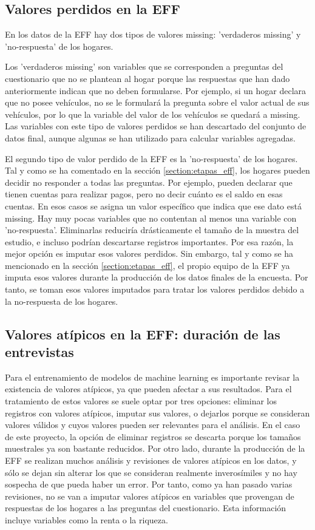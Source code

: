 \subsection*{Valores perdidos en la EFF}
\label{subsection:missing}

En los datos de la EFF hay dos tipos de valores missing: 'verdaderos missing' y 'no-respuesta' de los hogares.

Los 'verdaderos missing' son variables que se corresponden a preguntas del cuestionario que no se plantean al hogar porque las respuestas que han dado anteriormente indican que no deben formularse. Por ejemplo, si un hogar declara que no posee vehículos, no se le formulará la pregunta sobre el valor actual de sus vehículos, por lo que la variable del valor de los vehículos se quedará a missing. Las variables con este tipo de valores perdidos se han descartado del conjunto de datos final, aunque algunas se han utilizado para calcular variables agregadas.

El segundo tipo de valor perdido de la EFF es la 'no-respuesta' de los hogares. Tal y como se ha comentado en la sección \ref{section:etapas_eff}, los hogares pueden decidir no responder a todas las preguntas. Por ejemplo, pueden declarar que tienen cuentas para realizar pagos, pero no decir cuánto es el saldo en esas cuentas. En esos casos se asigna un valor específico que indica que ese dato está missing. Hay muy pocas variables que no contentan al menos una variable con 'no-respuesta'. Eliminarlas reduciría drásticamente el tamaño de la muestra del estudio, e incluso podrían descartarse registros importantes. Por esa razón, la mejor opción es imputar esos valores perdidos. Sin embargo, tal y como se ha mencionado en la sección \ref{section:etapas_eff}, el propio equipo de la EFF ya imputa esos valores durante la producción de los datos finales de la encuesta. Por tanto, se toman esos valores imputados para tratar los valores perdidos debido a la no-respuesta de los hogares.


\subsection*{Valores atípicos en la EFF: duración de las entrevistas}
\label{subsection:outliers}

Para el entrenamiento de modelos de machine learning es importante revisar la existencia de valores atípicos, ya que pueden afectar a sus resultados. Para el tratamiento de estos valores se suele optar por tres opciones: eliminar los registros con valores atípicos, imputar sus valores, o dejarlos porque se consideran valores válidos y cuyos valores pueden ser relevantes para el análisis. En el caso de este proyecto, la opción de eliminar registros se descarta porque los tamaños muestrales ya son bastante reducidos. Por otro lado, durante la producción de la EFF se realizan muchos análisis y revisiones de valores atípicos en los datos, y sólo se dejan sin alterar los que se consideran realmente inverosímiles y no hay sospecha de que pueda haber un error. Por tanto, como ya han pasado varias revisiones, no se van a imputar valores atípicos en variables que provengan de respuestas de los hogares a las preguntas del cuestionario. Esta información incluye variables como la renta o la riqueza.

